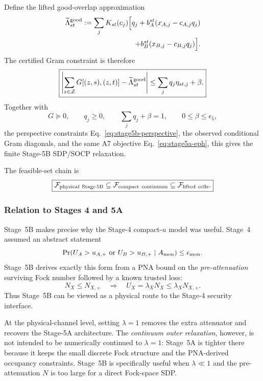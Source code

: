 \documentclass[11pt]{article}
\theoremstyle{remark}
\begin{document}
Define the lifted good-overlap approximation
\begin{align}
    \widetilde\Lambda_{st}^{\rm good}
    :=
    \sum_j
    K_{st}(c_j)
    \Big[
      q_j
      +
      b_A^{st}(x_{A,j}-c_{A,j}q_j)
      \nonumber\\
      +
      b_B^{st}(x_{B,j}-c_{B,j}q_j)
    \Big].
    \label{eq:stage5b-lifted-overlap}
\end{align}
The certified Gram constraint is therefore
\begin{equation}
    \boxed{
    \left|
      \sum_{z\in\mathcal Z}
      G[(z,s),(z,t)]
      -
      \widetilde\Lambda_{st}^{\rm good}
    \right|
    \le
    \sum_jq_j\eta_{st,j}
    +
    \beta.
    }
    \label{eq:stage5b-certified-soc}
\end{equation}
Together with
\begin{equation}
    G\succeq0,
    \qquad
    q_j\ge0,
    \qquad
    \sum_jq_j+\beta=1,
    \qquad
    0\le\beta\le\epsilon_5,
    \label{eq:stage5b-basic-cons}
\end{equation}
the perspective constraints
Eq.~\eqref{eq:stage5b-perspective}, the observed conditional Gram diagonals,
and the same A7 objective
Eq.~\eqref{eq:stage5a-eph}, this gives the finite Stage-5B SDP/SOCP
relaxation.

The feasible-set chain is
\begin{equation}
    \boxed{
    \mathcal F_{\rm physical\ Stage\,5B}
    \subseteq
    \mathcal F_{\rm compact\ continuum}
    \subseteq
    \mathcal F_{\rm lifted\ cells}.
    }
    \label{eq:stage5b-feasible-chain}
\end{equation}

\subsubsection{Relation to Stages 4 and 5A}

Stage~5B makes precise why the Stage-4 compact-\(u\) model was useful.
Stage~4 assumed an abstract statement
\[
    \Pr(
      U_A>u_{A,+}
      \text{ or }
      U_B>u_{B,+}
      \mid A_{\rm mon}
    )
    \le
    \epsilon_{\rm mon}.
\]
Stage~5B derives exactly this form from a PNA bound on the
\emph{pre-attenuation} surviving Fock number followed by a known trusted loss:
\[
    N_X\le N_{X,+}
    \quad\Longrightarrow\quad
    U_X=\lambda_XN_X
    \le
    \lambda_XN_{X,+}.
\]
Thus Stage~5B can be viewed as a physical route to the Stage-4 security
interface.

At the physical-channel level, setting \(\lambda=1\) removes the extra
attenuator and recovers the Stage-5A architecture.  The \emph{continuum outer
relaxation}, however, is not intended to be numerically continued to
\(\lambda=1\): Stage~5A is tighter there because it keeps the small discrete
Fock structure and the PNA-derived occupancy constraints.  Stage~5B is
specifically useful when \(\lambda\ll1\) and the pre-attenuation \(N\) is too
large for a direct Fock-space SDP.
\end{document}
